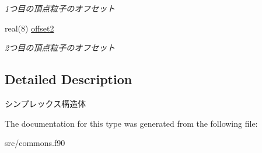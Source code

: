 \begin{DoxyCompactItemize}
\begin{DoxyCompactList}\small\item\em 1つ目の頂点粒子のオフセット \end{DoxyCompactList}\item 
\hypertarget{structcommons_1_1simplex_ac2c097529c43eca0a536e3fdfe9394ea}{real(8) \hyperlink{structcommons_1_1simplex_ac2c097529c43eca0a536e3fdfe9394ea}{offset2}}\label{structcommons_1_1simplex_ac2c097529c43eca0a536e3fdfe9394ea}

\begin{DoxyCompactList}\small\item\em 2つ目の頂点粒子のオフセット \end{DoxyCompactList}\end{DoxyCompactItemize}


\subsection{Detailed Description}
シンプレックス構造体 

The documentation for this type was generated from the following file\-:\begin{DoxyCompactItemize}
\item 
src/commons.\-f90\end{DoxyCompactItemize}
